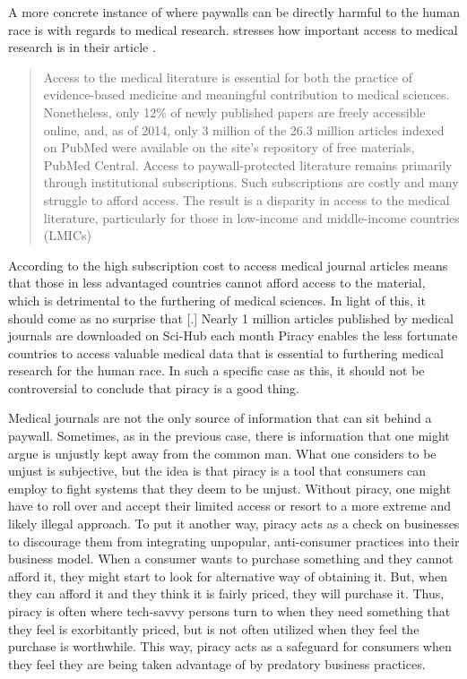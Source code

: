 \documentclass[onecolumn, 12pt]{article}
\begin{document}
\begin{refsection}
A more concrete instance of where paywalls can be directly harmful to the human race is
with regards to medical research. \citeauthor{till:medical-literature} stresses how important
access to medical research is in their article .
\blockcquote{till:medical-literature}[.]{%
  Access to the medical literature is essential for both the practice of
  evidence-based medicine and meaningful contribution to medical sciences.
  Nonetheless, only 12\% of newly published papers are freely accessible online,
  and, as of 2014, only 3 million of the 26.3 million articles indexed on PubMed
  were available on the site's repository of free materials, PubMed Central.
  Access to paywall-protected literature remains primarily through institutional
  subscriptions. Such subscriptions are costly and many struggle to afford
  access. The result is a disparity in access to the medical literature,
  particularly for those in low-income and middle-income countries (LMICs)%
}
According to \citeauthor{till:medical-literature} the high subscription cost to access medical
journal articles means that those in less advantaged countries cannot afford access to the
material, which is detrimental to the furthering of medical sciences. In light of this, it
should come as no surprise that [.]{
  Nearly 1 million articles published by medical journals are downloaded on
  Sci-Hub each month%
} Piracy enables the less fortunate countries to access valuable medical data that is
essential to furthering medical research for the human race. In such a specific case as
this, it should not be controversial to conclude that piracy is a good thing.

Medical journals are not the only source of information that can sit behind a paywall.
Sometimes, as in the previous case, there is information that one might argue is unjustly
kept away from the common man. What one considers to be unjust is subjective, but the idea
is that piracy is a tool that consumers can employ to fight systems that they deem to be
unjust. Without piracy, one might have to roll over and accept their limited access or
resort to a more extreme and likely illegal approach. To put it another way, piracy acts
as a check on businesses to discourage them from integrating unpopular, anti-consumer
practices into their business model. When a consumer wants to purchase something and they
cannot afford it, they might start to look for alternative way of obtaining it. But, when
they can afford it and they think it is fairly priced, they will purchase it. Thus, piracy
is often where tech-savvy persons turn to when they need something that they feel is
exorbitantly priced, but is not often utilized when they feel the purchase is worthwhile.
This way, piracy acts as a safeguard for consumers when they feel they are being taken
advantage of by predatory business practices.


\end{refsection}
\end{document}
